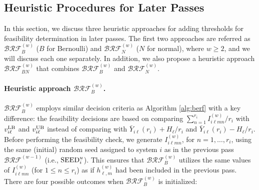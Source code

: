 \documentclass[11pt]{article}
\begin{document}
\subsection{Heuristic Procedures for Later Passes}
\label{subsec:HeuristicLaterPasses}

In this section, we discuss three heuristic approaches for adding thresholds for feasibility determination in later passes. The first two approaches are referred as $\mathcal{BRF}_B^{(w)}$ ($B$ for Bernoulli) and $\mathcal{BRF}_N^{(w)}$ ($N$ for normal), where $w\geq 2$, and we will discuss each one separately. In addition, we also propose a heuristic approach $\mathcal{BRF}_{BN}^{(w)}$ that combines  $\mathcal{BRF}_B^{(w)}$ and $\mathcal{BRF}_N^{(w)}$.


\paragraph{Heuristic approach $\mathcal{BRF}_B^{(w)}$.}
$\mathcal{BRF}_B^{(w)}$ employs similar decision criteria as Algorithm \ref{alg:berf} with a key difference: the feasibility decisions are based on comparing $\sum_{n=1}^{r_i} I_{i\ell mn}^{(w)}/r_i$ with $v_{i\ell}^{\rm LB}$ and $v_{i\ell}^{\rm UB}$ instead of comparing with $\bar{Y}_{i\ell}(r_i)+H_\ell/r_i$ and $\bar{Y}_{i\ell}(r_i)-H_\ell/r_i$. 
Before performing the feasibility check, we generate $I_{i\ell mn}^{(w)}$, for $n=1,\ldots,r_i$, using the same (initial) random seed assigned to system $i$ as in the previous pass $\mathcal{BRF}^{(w-1)}$ (i.e., ${\rm SEED}^u_i$). This ensures that $\mathcal{BRF}_B^{(w)}$ utilizes the same values of $I_{i\ell mn}^{(w)}$ (for $1\leq n\leq r_i$) as if $h_{\ell,m}^{(w)}$ had been included in the previous pass.
There are four possible outcomes when $\mathcal{BRF}_B^{(w)}$ is initialized: 
\end{document}
